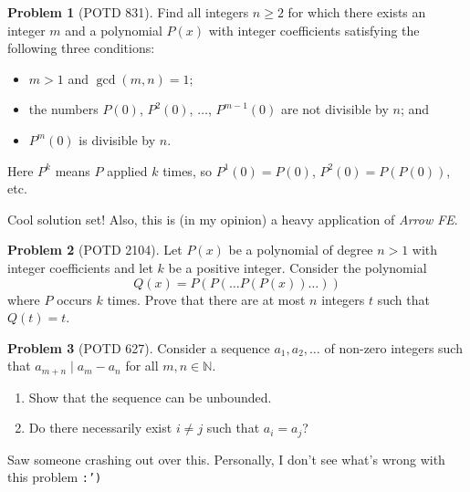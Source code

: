 \documentclass[11pt]{article} %
\theoremstyle{definition}
\newtheorem{problem}{Problem}
\theoremstyle{remark}
\begin{document}
\begin{problem}[POTD 831]
    Find all integers \(n \ge 2\) for which there exists an integer \(m\) and a polynomial \(P(x)\) with integer coefficients satisfying the following three conditions:
    \begin{itemize}
        \item \(m > 1\) and \(\gcd(m,n) = 1\);
        \item the numbers \(P(0)\), \(P^2(0)\), \(\ldots\), \(P^{m-1}(0)\) are not divisible by \(n\); and
        \item \(P^m(0)\) is divisible by \(n\).
    \end{itemize}
    Here \(P^k\) means \(P\) applied \(k\) times, so \(P^1(0) = P(0)\), \(P^2(0) = P(P(0))\), etc.
    \begin{talks}
        \begin{talk}
            Cool solution set! Also, this is (in my opinion) a heavy application of \emph{Arrow FE}.
        \end{talk}
    \end{talks}
\end{problem}

\begin{problem}[POTD 2104]
    Let \(P(x)\) be a polynomial of degree \(n > 1\) with integer coefficients and let \(k\) be a positive integer. Consider the polynomial\[ Q(x) = P(P(\dots P(P(x)) \dots )) \] where \(P\) occurs \(k\) times. Prove that there are at most \(n\) integers \(t\) such that \(Q(t) = t\).
\end{problem}

\begin{problem}[POTD 627]
    Consider a sequence \(a_1, a_2, \dots \) of non-zero integers such that \(a_{m + n} \mid a_{m} - a_{n}\) for all \(m, n \in \mathbb{N}.\)
    \begin{enumerate}[label=(\alph*)]
        \item Show that the sequence can be unbounded.
        \item Do there necessarily exist \(i \neq j\) such that \(a_i = a_j\)?
    \end{enumerate}
    \begin{talks}
        \begin{talk}
            Saw someone crashing out over this. Personally, I don't see what's wrong with this problem \texttt{:')}
        \end{talk}
    \end{talks}
\end{problem}
\end{document}
